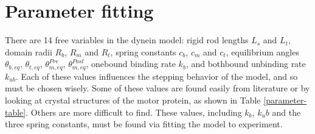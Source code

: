 \documentclass[
11pt, %
english, %
singlespacing, %
headsepline, %
chapterinoneline, %
]{MastersDoctoralThesis} %
\begin{document}




\section{Parameter fitting}
There are 14 free variables in the dynein model: rigid rod lengths $L_s$ and $L_t$, domain radii $R_b$, $R_m$ and $R_t$, spring constants $c_b$, $c_m$ and $c_t$, equilibrium angles $\theta_{b,eq}$, $\theta_{t,eq}$, $\theta_{m,eq}^{Pre}$, $\theta_{m,eq}^{Post}$, onebound binding rate $k_b$, and bothbound unbinding rate $k_{ub}$. Each of these values influences the stepping behavior of the model, and so must be chosen wisely. Some of these values are found easily from literature or by looking at crystal structures of the motor protein, as shown in Table \ref{parameter-table}. Others are more difficult to find. These values, including $k_b$, $k_ub$ and the three spring constants, must be found via fitting the model to experiment.\\
\end{document}
